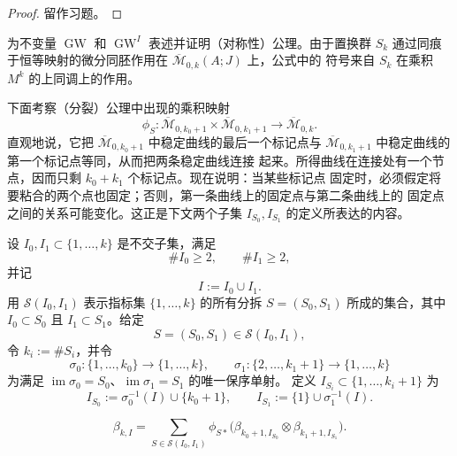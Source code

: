 \begin{proof}
留作习题。
\end{proof}

\begin{exercise}\label{ex:7-5-8}
为不变量 $\operatorname{GW}$ 和 $\operatorname{GW}^I$ 表述并证明（对称性）公理。由于置换群
$S_k$ 通过同痕于恒等映射的微分同胚作用在 $\overline{\mathcal M}_{0,k}(A;J)$ 上，公式中的
符号来自 $S_k$ 在乘积 $M^k$ 的上同调上的作用。
\end{exercise}

下面考察（分裂）公理中出现的乘积映射
\[
  \phi_S:\overline{\mathcal M}_{0,k_0+1}
  \times\overline{\mathcal M}_{0,k_1+1}
  \longrightarrow\overline{\mathcal M}_{0,k}.
\]
直观地说，它把 $\overline{\mathcal M}_{0,k_0+1}$ 中稳定曲线的最后一个标记点与
$\overline{\mathcal M}_{0,k_1+1}$ 中稳定曲线的第一个标记点等同，从而把两条稳定曲线连接
起来。所得曲线在连接处有一个节点，因而只剩 $k_0+k_1$ 个标记点。现在说明：当某些标记点
固定时，必须假定将要粘合的两个点也固定；否则，第一条曲线上的固定点与第二条曲线上的
固定点之间的关系可能变化。这正是下文两个子集 $I_{S_0},I_{S_1}$ 的定义所表达的内容。

设 $I_0,I_1\subset\{1,\ldots,k\}$ 是不交子集，满足
\[
  \#I_0\ge2,\qquad \#I_1\ge2,
\]
并记
\[
  I:=I_0\cup I_1.
\]
用 $\mathcal S(I_0,I_1)$ 表示指标集 $\{1,\ldots,k\}$ 的所有分拆
$S=(S_0,S_1)$ 所成的集合，其中 $I_0\subset S_0$ 且 $I_1\subset S_1$。给定
\[
  S=(S_0,S_1)\in\mathcal S(I_0,I_1),
\]
令 $k_i:=\#S_i$，并令
\[
  \sigma_0:\{1,\ldots,k_0\}\longrightarrow\{1,\ldots,k\},
  \qquad
  \sigma_1:\{2,\ldots,k_1+1\}\longrightarrow\{1,\ldots,k\}
\]
为满足 $\operatorname{im}\sigma_0=S_0$、$\operatorname{im}\sigma_1=S_1$ 的唯一保序单射。
定义 $I_{S_i}\subset\{1,\ldots,k_i+1\}$ 为
\[
  I_{S_0}:=\sigma_0^{-1}(I)\cup\{k_0+1\},
  \qquad
  I_{S_1}:=\{1\}\cup\sigma_1^{-1}(I).
\]

\begin{lemma}[Keel]\label{lem:7-5-9}
\[
  \beta_{k,I}
  =\sum_{S\in\mathcal S(I_0,I_1)}
    \phi_{S*}\bigl(
      \beta_{k_0+1,I_{S_0}}\otimes\beta_{k_1+1,I_{S_1}}
    \bigr).
\]
\end{lemma}

